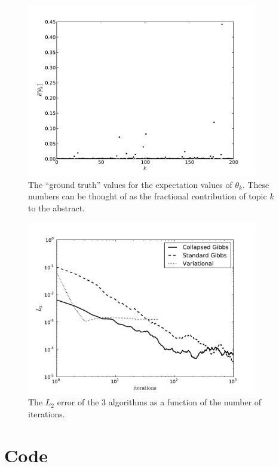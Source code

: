 \documentclass[11pt]{article}
\newcommand{\figlabel}[1]{\label{fig:#1}}
\begin{document}
\begin{figure}[htbp]
    \centering
    \includegraphics[width=0.9\textwidth]{../truth.pdf}
    \caption{The ``ground truth'' values for the expectation values
        of $\theta_k$. These numbers can be thought of as the fractional
        contribution of topic $k$ to the abstract.\figlabel{truth}}
\end{figure}

\begin{figure}[htbp]
    \centering
    \includegraphics[width=0.9\textwidth]{../results.pdf}
    \caption{The $L_2$ error of the 3 algorithms as a function of the
        number of iterations.\figlabel{results}}
\end{figure}

\newpage

\section{Code} \label{sect:code}


\end{document}
